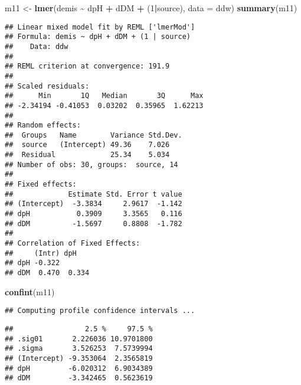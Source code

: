 \documentclass[
]{article}
\newenvironment{Shaded}{\begin{snugshade}}{\end{snugshade}}
\newcommand{\AttributeTok}[1]{\textcolor[rgb]{0.13,0.29,0.53}{#1}}
\newcommand{\DecValTok}[1]{\textcolor[rgb]{0.00,0.00,0.81}{#1}}
\newcommand{\FunctionTok}[1]{\textcolor[rgb]{0.13,0.29,0.53}{\textbf{#1}}}
\newcommand{\NormalTok}[1]{#1}
\newcommand{\OtherTok}[1]{\textcolor[rgb]{0.56,0.35,0.01}{#1}}
\newcommand{\SpecialCharTok}[1]{\textcolor[rgb]{0.81,0.36,0.00}{\textbf{#1}}}
\begin{document}
\begin{Shaded}
\begin{Highlighting}[]
\NormalTok{m11 }\OtherTok{\textless{}{-}} \FunctionTok{lmer}\NormalTok{(demis }\SpecialCharTok{\textasciitilde{}}\NormalTok{ dpH }\SpecialCharTok{+}\NormalTok{ dDM }\SpecialCharTok{+}\NormalTok{ (}\DecValTok{1}\SpecialCharTok{|}\NormalTok{source), }\AttributeTok{data =}\NormalTok{ ddw)}
\FunctionTok{summary}\NormalTok{(m11)}
\end{Highlighting}
\end{Shaded}

\begin{verbatim}
## Linear mixed model fit by REML ['lmerMod']
## Formula: demis ~ dpH + dDM + (1 | source)
##    Data: ddw
## 
## REML criterion at convergence: 191.9
## 
## Scaled residuals: 
##      Min       1Q   Median       3Q      Max 
## -2.34194 -0.41053  0.03202  0.35965  1.62213 
## 
## Random effects:
##  Groups   Name        Variance Std.Dev.
##  source   (Intercept) 49.36    7.026   
##  Residual             25.34    5.034   
## Number of obs: 30, groups:  source, 14
## 
## Fixed effects:
##             Estimate Std. Error t value
## (Intercept)  -3.3834     2.9617  -1.142
## dpH           0.3909     3.3565   0.116
## dDM          -1.5697     0.8808  -1.782
## 
## Correlation of Fixed Effects:
##     (Intr) dpH   
## dpH -0.322       
## dDM  0.470  0.334
\end{verbatim}

\begin{Shaded}
\begin{Highlighting}[]
\FunctionTok{confint}\NormalTok{(m11)}
\end{Highlighting}
\end{Shaded}

\begin{verbatim}
## Computing profile confidence intervals ...
\end{verbatim}

\begin{verbatim}
##                 2.5 %     97.5 %
## .sig01       2.226036 10.9701800
## .sigma       3.526253  7.5739994
## (Intercept) -9.353064  2.3565819
## dpH         -6.020312  6.9034389
## dDM         -3.342465  0.5623619
\end{verbatim}
\end{document}
